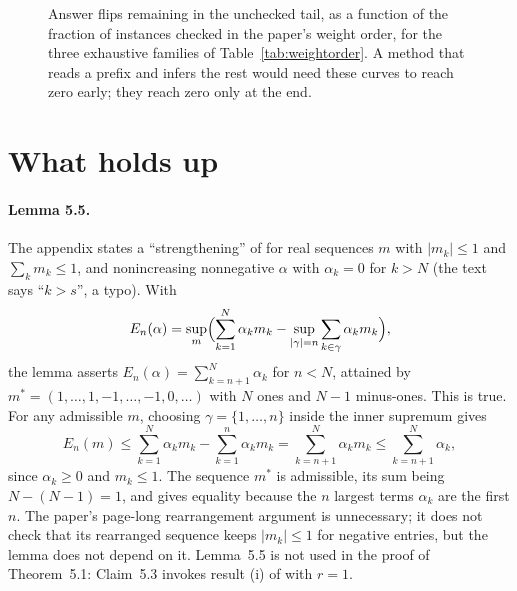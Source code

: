 \documentclass[11pt,a4paper]{article}
\begin{document}
\begin{figure}[h]
\centering
{}
\caption{Answer flips remaining in the unchecked tail, as a function of the fraction of instances checked in the paper's weight order, for the three exhaustive families of Table~\ref{tab:weightorder}. A method that reads a prefix and infers the rest would need these curves to reach zero early; they reach zero only at the end.}
\label{fig:suffix}
\end{figure}

\section{What holds up}

\paragraph{Lemma 5.5.} The appendix states a ``strengthening'' of \cite{stepanets} for real sequences $m$ with $|m_k|\le 1$ and $\sum_k m_k\le 1$, and nonincreasing nonnegative $\alpha$ with $\alpha_k=0$ for $k>N$ (the text says ``$k>s$'', a typo). With
\[
E_n(\alpha)=\sup_m\Bigl(\sum_{k=1}^N\alpha_k m_k-\sup_{|\gamma|=n}\sum_{k\in\gamma}\alpha_k m_k\Bigr),
\]
the lemma asserts $E_n(\alpha)=\sum_{k=n+1}^N\alpha_k$ for $n<N$, attained by $m^*=(1,\ldots,1,-1,\ldots,-1,0,\ldots)$ with $N$ ones and $N-1$ minus-ones. This is true. For any admissible $m$, choosing $\gamma=\{1,\ldots,n\}$ inside the inner supremum gives
\[
E_n(m)\le\sum_{k=1}^N\alpha_k m_k-\sum_{k=1}^n\alpha_k m_k=\sum_{k=n+1}^N\alpha_k m_k\le\sum_{k=n+1}^N\alpha_k,
\]
since $\alpha_k\ge 0$ and $m_k\le 1$. The sequence $m^*$ is admissible, its sum being $N-(N-1)=1$, and gives equality because the $n$ largest terms $\alpha_k$ are the first $n$. The paper's page-long rearrangement argument is unnecessary; it does not check that its rearranged sequence keeps $|m_k|\le 1$ for negative entries, but the lemma does not depend on it. Lemma~5.5 is not used in the proof of Theorem~5.1: Claim~5.3 invokes result (i) of \cite{stepanets} with $r=1$.
\end{document}
